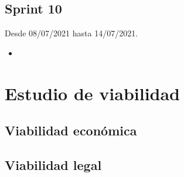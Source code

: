 \subsection{Sprint 10}

Desde 08/07/2021 hasta 14/07/2021.

\begin{itemize}
	\item
\end{itemize}

\section{Estudio de viabilidad}

\subsection{Viabilidad económica}

\subsection{Viabilidad legal}


